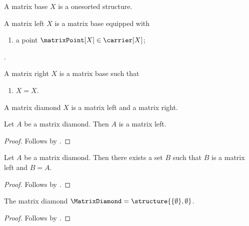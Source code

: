 \begin{struct}\label{matrix_base}
    A matrix base $X$ is a onesorted structure.
\end{struct}

\begin{struct}\label{matrix_left}
    A matrix left $X$ is a matrix base equipped with
    \begin{enumerate}
        \item\label{matrix_left_point}
            a point $\matrixPoint[X]\in\carrier[X]$;
    \end{enumerate}
    .
\end{struct}

\begin{struct}\label{matrix_right}
    A matrix right $X$ is a matrix base such that
    \begin{enumerate}
        \item\label{matrix_right_reflexive} $X=X$.
    \end{enumerate}
\end{struct}

\begin{struct}\label{matrix_diamond}
    A matrix diamond $X$ is a matrix left and a matrix right.
\end{struct}

\begin{proposition}\label{matrix_cited_parent}
    Let $A$ be a matrix diamond.
    Then $A$ is a matrix left.
\end{proposition}
\begin{proof}
    Follows by .
\end{proof}

\begin{proposition}\label{matrix_cited_parent_witness}
    Let $A$ be a matrix diamond.
    Then there exists a set $B$ such that $B$ is a matrix left and $B=A$.
\end{proposition}
\begin{proof}
    Follows by .
\end{proof}

\begin{instance}\label{matrix_diamond_object}
    The matrix diamond
    $\MatrixDiamond=\structure{\{\emptyset\},\emptyset}$.
\end{instance}
\begin{proof}
    Follows by
    .
\end{proof}

